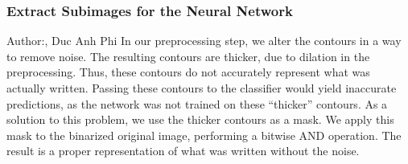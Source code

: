 \documentclass[11pt]{article}
\begin{document}
\subsubsection{Extract Subimages for the Neural Network}
\small{Author:, Duc Anh Phi} \newline \newline
In our preprocessing step, we alter the contours in a way to remove noise. The resulting contours are thicker, due to dilation in the preprocessing. Thus, these contours do not accurately represent what was actually written. Passing these contours to the classifier would yield inaccurate predictions, as the network was not trained on these “thicker” contours.
As a solution to this problem, we use the thicker contours as a mask. We apply this mask to the binarized original image, performing a bitwise AND operation. The result is a proper representation of what was written without the noise.
\end{document}
